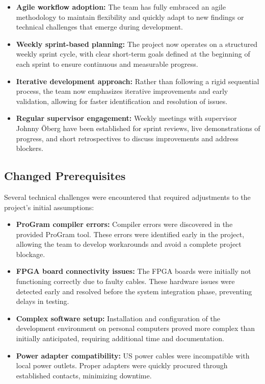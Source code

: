 \documentclass[10pt]{article}
\begin{document}
\begin{itemize}
    \item \textbf{Agile workflow adoption:} The team has fully embraced an agile methodology to maintain flexibility and quickly adapt to new findings or technical challenges that emerge during development.
    
    \item \textbf{Weekly sprint-based planning:} The project now operates on a structured weekly sprint cycle, with clear short-term goals defined at the beginning of each sprint to ensure continuous and measurable progress.
    
    \item \textbf{Iterative development approach:} Rather than following a rigid sequential process, the team now emphasizes iterative improvements and early validation, allowing for faster identification and resolution of issues.
    
    \item \textbf{Regular supervisor engagement:} Weekly meetings with supervisor Johnny Öberg have been established for sprint reviews, live demonstrations of progress, and short retrospectives to discuss improvements and address blockers.
\end{itemize}

\subsection{Changed Prerequisites}
Several technical challenges were encountered that required adjustments to the project's initial assumptions:

\begin{itemize}
    \item \textbf{ProGram compiler errors:} Compiler errors were discovered in the provided ProGram tool. These errors were identified early in the project, allowing the team to develop workarounds and avoid a complete project blockage.
    
    \item \textbf{FPGA board connectivity issues:} The FPGA boards were initially not functioning correctly due to faulty cables. These hardware issues were detected early and resolved before the system integration phase, preventing delays in testing.
    
    \item \textbf{Complex software setup:} Installation and configuration of the development environment on personal computers proved more complex than initially anticipated, requiring additional time and documentation.
    
    \item \textbf{Power adapter compatibility:} US power cables were incompatible with local power outlets. Proper adapters were quickly procured through established contacts, minimizing downtime.
\end{itemize}
\end{document}
